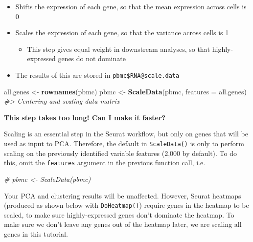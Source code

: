 \documentclass[
]{book}
\newenvironment{Shaded}{\begin{snugshade}}{\end{snugshade}}
\newcommand{\AttributeTok}[1]{\textcolor[rgb]{0.13,0.29,0.53}{#1}}
\newcommand{\CommentTok}[1]{\textcolor[rgb]{0.56,0.35,0.01}{\textit{#1}}}
\newcommand{\FunctionTok}[1]{\textcolor[rgb]{0.13,0.29,0.53}{\textbf{#1}}}
\newcommand{\NormalTok}[1]{#1}
\newcommand{\OtherTok}[1]{\textcolor[rgb]{0.56,0.35,0.01}{#1}}
\providecommand{\tightlist}{%
  \setlength{\itemsep}{0pt}\setlength{\parskip}{0pt}}
\begin{document}
\begin{itemize}
\tightlist
\item
  Shifts the expression of each gene, so that the mean expression across cells is 0
\item
  Scales the expression of each gene, so that the variance across cells is 1

  \begin{itemize}
  \tightlist
  \item
    This step gives equal weight in downstream analyses, so that highly-expressed genes do not dominate
  \end{itemize}
\item
  The results of this are stored in \texttt{pbmc\$RNA@scale.data}
\end{itemize}

\begin{Shaded}
\begin{Highlighting}[]
\NormalTok{all.genes }\OtherTok{\textless{}{-}} \FunctionTok{rownames}\NormalTok{(pbmc)}
\NormalTok{pbmc }\OtherTok{\textless{}{-}} \FunctionTok{ScaleData}\NormalTok{(pbmc, }\AttributeTok{features =}\NormalTok{ all.genes)}
\CommentTok{\#\textgreater{} Centering and scaling data matrix}
\end{Highlighting}
\end{Shaded}

\textbf{This step takes too long! Can I make it faster?}

Scaling is an essential step in the Seurat workflow, but only on genes that will be used as input to PCA. Therefore, the default in \texttt{ScaleData()} is only to perform scaling on the previously identified variable features (2,000 by default). To do this, omit the \texttt{features} argument in the previous function call, i.e.

\begin{Shaded}
\begin{Highlighting}[]
\CommentTok{\# pbmc \textless{}{-} ScaleData(pbmc)}
\end{Highlighting}
\end{Shaded}

Your PCA and clustering results will be unaffected. However, Seurat heatmaps (produced as shown below with \texttt{DoHeatmap()}) require genes in the heatmap to be scaled, to make sure highly-expressed genes don't dominate the heatmap. To make sure we don't leave any genes out of the heatmap later, we are scaling all genes in this tutorial.

~
\end{document}
